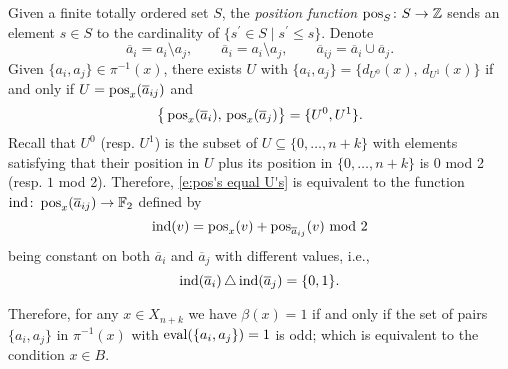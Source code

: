 Given a finite totally ordered set $S$, the \textit{position function} $\operatorname{pos}_S \colon S \to \mathbb{Z}$ sends an element $s \in S$ to the cardinality of $\{s^\prime \in S \mid s^\prime \leq s\}$.
Denote
\begin{equation*}
\overline{a}_{i} = a_i \setminus a_j, \qquad
\overline{a}_{i} = a_i \setminus a_j, \qquad
\overline{a}_{ij} = \overline{a}_i \cup \overline{a}_j.
\end{equation*}
Given $\{a_i, a_j\} \in \pi^{-1}(x)$, there exists $U$ with $\{a_i, a_j\} = \{d_{U^0}(x),\, d_{U^1}(x)\}$
if and only if $U = \operatorname{pos}_{x}(\overline{a}_{ij})$ and
\begin{equation} \label{e:pos's equal U's}
\big\{\operatorname{pos}_{x}(\overline{a}_i),\, \operatorname{pos}_{x}(\overline{a}_j)\big\} = \{U^0, U^1\}.
\end{equation}
Recall that $U^0$ (resp. $U^1$) is the subset of $U \subseteq \{0, \dots, n+k\}$ with elements satisfying that their position in $U$ plus its position in $\{0, \dots, n+k\}$ is $0$ mod 2 (resp. $1$ mod 2).
Therefore, \eqref{e:pos's equal U's} is equivalent to the function $\mathrm{ind} \colon \operatorname{pos}_x(\overline{a}_{ij}) \to \mathbb{F}_2$ defined by
\begin{equation*}
\mathrm{ind}(v) = \operatorname{pos}_{x}(v) + \operatorname{pos}_{\overline{a}_{ij}}(v) \text{ mod }2
\end{equation*}
being constant on both $\overline{a}_i$ and $\overline{a}_j$ with different values, i.e., 
\begin{equation*}
\mathrm{ind}(\overline{a}_i) \operatorname{\triangle} \mathrm{ind}(\overline{a}_j) = \{0,1\}.
\end{equation*}

Therefore, for any $x \in X_{n+k}$ we have $\beta(x) = 1$ if and only if the set of pairs $\{a_i, a_j\}$ in $\pi^{-1}(x)$ with $\operatorname{eval}(\{a_i, a_j\}) = 1$ is odd; which is equivalent to the condition $x \in B$.
